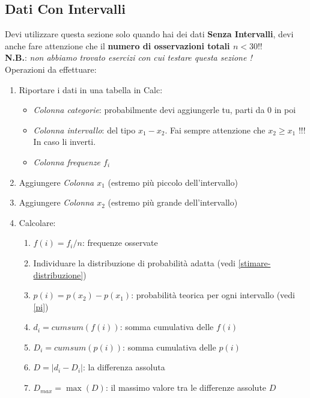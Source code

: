 \subsection{Dati Con Intervalli}

Devi utilizzare questa sezione solo quando hai dei dati \textbf{Senza
      Intervalli}, devi anche fare attenzione che il \textbf{numero di
      osservazioni totali $n < 30$}!!\\

\textbf{N.B.}: \textit{non abbiamo trovato esercizi con cui testare questa
      sezione !}\\

Operazioni da effettuare:

\begin{enumerate}
      \item Riportare i dati in una tabella in Calc:
            \begin{itemize}
                  \item \textit{Colonna categorie}: probabilmente devi aggiungerle
                        tu, parti da 0 in poi
                  \item \textit{Colonna intervallo}: del tipo $x_1 - x_2$. Fai
                        sempre attenzione che $x_2 \ge x_1$ !!! In caso li inverti.
                  \item \textit{Colonna frequenze $f_i$}
            \end{itemize}
      \item Aggiungere \textit{Colonna $x_1$} (estremo più piccolo
            dell'intervallo)
      \item Aggiungere \textit{Colonna $x_2$} (estremo più grande dell'intervallo)
      \item Calcolare:
            \begin{enumerate}
                  \item $f(i) = f_i / n$: frequenze osservate
                  \item Individuare la distribuzione di probabilità adatta (vedi
                        \ref{stimare-distribuzione})
                  \item $p(i) = p(x_2) - p(x_1)$: probabilità teorica per ogni
                        intervallo (vedi \ref{pi})
                  \item $d_i = cumsum(f(i))$: somma cumulativa delle $f(i)$
                  \item $D_i = cumsum(p(i))$: somma cumulativa delle $p(i)$
                  \item $D = |d_i - D_i|$: la differenza assoluta
                  \item $D_{max} = \max(D)$: il massimo valore tra le differenze
                        assolute $D$
            \end{enumerate}
\end{enumerate}

